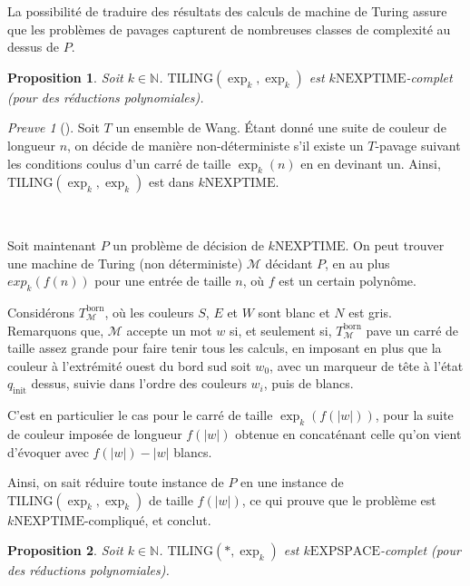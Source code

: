 \documentclass{scrartcl}
\newcommand{\N}{\mathbb N}
\newtheorem{proposition}{Proposition}
\theoremstyle{definition}
\theoremstyle{remark}
\newtheorem{preuve}{Preuve}
\begin{document}
La possibilité de traduire des résultats des calculs de machine de Turing assure que les problèmes de pavages capturent de nombreuses classes de complexité au dessus de $P$.

\begin{proposition}
  Soit $k\in\N$. $\mathrm{TILING}(\exp_k,\exp_k)$ est $k\mathrm{NEXPTIME}$-complet (pour des réductions polynomiales).
\end{proposition}

\begin{preuve}[]
  Soit $T$ un ensemble de Wang. Étant donné une suite de couleur de longueur $n$, on décide de manière non-déterministe s'il existe un $T$-pavage suivant les conditions coulus d'un carré de taille $\exp_k(n)$ en en devinant un. Ainsi, $\mathrm{TILING}(\exp_k,\exp_k)$ est dans $k\mathrm{NEXPTIME}$.

  \

  Soit maintenant $P$ un problème de décision de $k\mathrm{NEXPTIME}$. On peut trouver une machine de Turing (non déterministe) $\mathcal M$ décidant $P$, en au plus $exp_k(f(n))$ pour une entrée de taille $n$, où $f$ est un certain polynôme.

  Considérons $T^\mathrm{born}_{\mathcal M}$, où les couleurs $S$, $E$ et $W$ sont blanc et $N$ est gris. Remarquons que, $\mathcal M$ accepte un mot $w$ si, et seulement si, $T^\mathrm{born}_\mathcal M$ pave un carré de taille assez grande pour faire tenir tous les calculs, en imposant en plus que la couleur à l'extrémité ouest du bord sud soit $w_0$, avec un marqueur de tête à l'état $q_\mathrm{init}$ dessus, suivie dans l'ordre des couleurs $w_i$, puis de blancs.

  C'est en particulier le cas pour le carré de taille $\exp_k(f(|w|))$, pour la suite de couleur imposée de longueur $f(|w|)$ obtenue en concaténant celle qu'on vient d'évoquer avec $f(|w|)-|w|$ blancs.

  Ainsi, on sait réduire toute instance de $P$ en une instance de $\mathrm{TILING}(\exp_k,\exp_k)$ de taille $f(|w|)$, ce qui prouve que le problème est $k\mathrm{NEXPTIME}$-compliqué, et conclut.
\end{preuve}

\begin{proposition}
  Soit $k\in\N$. $\mathrm{TILING}(*,\exp_k)$ est $k\mathrm{EXPSPACE}$-complet (pour des réductions polynomiales).
\end{proposition}
\end{document}
